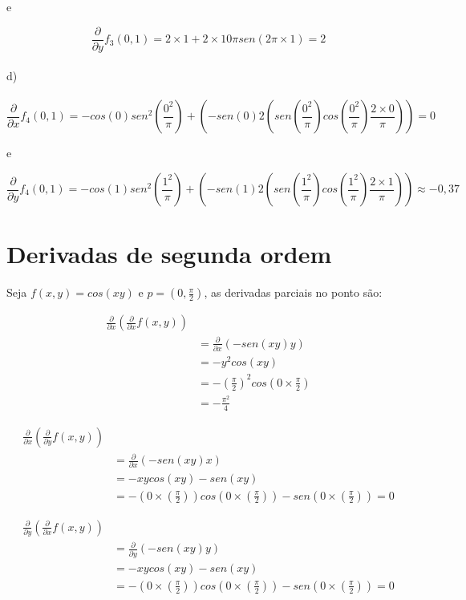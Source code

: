 \documentclass[11pt]{article}
\begin{document}
e

$$\frac{\partial}{\partial y} f_3(0, 1) = 2 \times 1 + 2\times10\pi sen(2 \pi \times 1) = 2$$
\\
d)\\
\\
$$\frac{\partial}{\partial x} f_4(0, 1) = -cos(0)sen^2 \left(\frac{0^2}{\pi} \right) + (-sen(0)2(sen \left(\frac{0^2}{\pi} \right)cos \left(\frac{0^2}{\pi} \right)\frac{2 \times 0}{\pi})) = 0$$

e

$$\frac{\partial}{\partial y} f_4(0, 1) = -cos(1)sen^2 \left(\frac{1^2}{\pi} \right) + (-sen(1)2(sen \left(\frac{1^2}{\pi} \right)cos \left(\frac{1^2}{\pi} \right)\frac{2 \times 1}{\pi})) \approx -0,37$$

\section{Derivadas de segunda ordem}

Seja $f(x, y) = cos(xy)$ e $p = (0, \frac{\pi}{2})$, as derivadas parciais no ponto são:

\begin{align*}
\frac{\partial}{\partial x} \left(\frac{\partial}{\partial x} f(x, y) \right)\\
& = \frac{\partial}{\partial x} (-sen(xy)y)\\
& = -y^2cos(xy)\\
& = -\left(\frac{\pi}{2} \right)^2cos \left(0 \times \frac{\pi}{2} \right)\\
& = - \frac{\pi^2}{4}
\end{align*}

\begin{align*}
\frac{\partial}{\partial x} \left(\frac{\partial}{\partial y} f(x, y) \right)\\
& = \frac{\partial}{\partial x} (-sen(xy)x)\\
& = -xycos(xy) - sen(xy)\\
& = -(0 \times \left( \frac{\pi}{2} \right))cos(0 \times \left( \frac{\pi}{2} \right)) - sen(0 \times \left( \frac{\pi}{2} \right)) = 0 
\end{align*}

\begin{align*}
\frac{\partial}{\partial y} \left(\frac{\partial}{\partial x} f(x, y) \right)\\
& = \frac{\partial}{\partial y} (-sen(xy)y) \\
& = -xycos(xy) - sen(xy)\\
& = -(0 \times \left( \frac{\pi}{2} \right))cos(0 \times \left( \frac{\pi}{2} \right)) - sen(0 \times \left( \frac{\pi}{2} \right)) = 0 
\end{align*}
\end{document}
